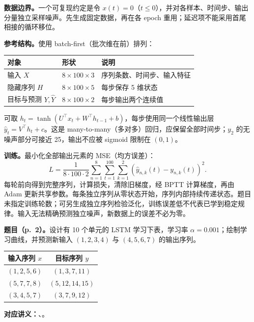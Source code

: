 \textbf{数据边界。}一个可复现约定是令 $x(t)=0$（$t\le0$），并对各样本、时间步、输出分量独立采样噪声。先生成固定数据，再在各 epoch 重用；延迟项不能采用首尾相接的循环移位。

\textbf{参考结构。}使用 batch-first（批次维在前）排列：
\begin{center}
\begin{tabular}{@{}lll@{}}
\toprule
对象 & 形状 & 说明 \\
\midrule
输入 $X$ & $8\times100\times3$ & 序列条数、时间步、输入特征 \\
隐藏序列 $H$ & $8\times100\times5$ & 每步保存 5 维状态 \\
目标与预测 $Y,\hat Y$ & $8\times100\times2$ & 每步输出两个连续值 \\
\bottomrule
\end{tabular}
\end{center}
可取 $h_t=\tanh(U^\top x_t+W^\top h_{t-1}+b)$，每步使用同一个线性输出层 $\hat y_t=V^\top h_t+c$。这是 many-to-many（多对多）回归，应保留全部时间步；$y_2$ 的无噪声部分可接近 25，输出不应被 sigmoid 限制在 $(0,1)$。

\textbf{训练。}最小化全部输出元素的 MSE（均方误差）：
\[
 L=\frac1{8\cdot100\cdot2}\sum_{n=1}^{8}\sum_{t=1}^{100}\sum_{k=1}^{2}
   (\hat y_{n,k}(t)-y_{n,k}(t))^2.
\]
每轮前向得到完整序列，计算损失，清除旧梯度，经 BPTT 计算梯度，再由 Adam 更新共享参数。每条独立序列从零状态开始，序列内部持续传递状态。题目未指定训练轮数；可另生成独立序列检验泛化，训练误差低不代表已学到稳定规律。输入无法精确预测独立噪声，新数据上的误差不必为零。

\nopagebreak[4]
\textbf{题目（p.~2）。}设计有 10 个单元的 LSTM 学习下表，学习率 $\alpha=0.001$；绘制学习曲线，并预测新输入 $(1,2,3,4)$ 与 $(4,5,6,7)$ 的输出序列。
\begin{center}
\begin{tabular}{@{}cc@{}}
\toprule
输入序列 $x$ & 目标序列 $y$ \\
\midrule
$(1,2,5,6)$ & $(1,3,7,11)$ \\
$(5,7,7,8)$ & $(5,12,14,15)$ \\
$(3,4,5,7)$ & $(3,7,9,12)$ \\
\bottomrule
\end{tabular}
\end{center}
\textbf{对应讲义：}、。

